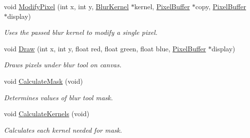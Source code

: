 \begin{DoxyCompactItemize}
\item 
void \hyperlink{classimage__tools_1_1Blur_a37b14619123c27eb6472c02b3218d549}{Modify\+Pixel} (int x, int y, \hyperlink{classimage__tools_1_1BlurKernel}{Blur\+Kernel} $\ast$kernel, \hyperlink{classimage__tools_1_1PixelBuffer}{Pixel\+Buffer} $\ast$copy, \hyperlink{classimage__tools_1_1PixelBuffer}{Pixel\+Buffer} $\ast$display)\hypertarget{classimage__tools_1_1Blur_a37b14619123c27eb6472c02b3218d549}{}\label{classimage__tools_1_1Blur_a37b14619123c27eb6472c02b3218d549}

\begin{DoxyCompactList}\small\item\em Uses the passed blur kernel to modify a single pixel. \end{DoxyCompactList}\item 
void \hyperlink{classimage__tools_1_1Blur_aede29f1a04672ce1cf1368c587e3a05c}{Draw} (int x, int y, float red, float green, float blue, \hyperlink{classimage__tools_1_1PixelBuffer}{Pixel\+Buffer} $\ast$display)\hypertarget{classimage__tools_1_1Blur_aede29f1a04672ce1cf1368c587e3a05c}{}\label{classimage__tools_1_1Blur_aede29f1a04672ce1cf1368c587e3a05c}

\begin{DoxyCompactList}\small\item\em Draws pixels under blur tool on canvas. \end{DoxyCompactList}\item 
void \hyperlink{classimage__tools_1_1Blur_a8ebf547842f47892ace6bff8d1586da1}{Calculate\+Mask} (void)\hypertarget{classimage__tools_1_1Blur_a8ebf547842f47892ace6bff8d1586da1}{}\label{classimage__tools_1_1Blur_a8ebf547842f47892ace6bff8d1586da1}

\begin{DoxyCompactList}\small\item\em Determines values of blur tool mask. \end{DoxyCompactList}\item 
void \hyperlink{classimage__tools_1_1Blur_ac10a4e13df221077e0e389284fdfbceb}{Calculate\+Kernels} (void)\hypertarget{classimage__tools_1_1Blur_ac10a4e13df221077e0e389284fdfbceb}{}\label{classimage__tools_1_1Blur_ac10a4e13df221077e0e389284fdfbceb}

\begin{DoxyCompactList}\small\item\em Calculates each kernel needed for mask. \end{DoxyCompactList}\end{DoxyCompactItemize}
